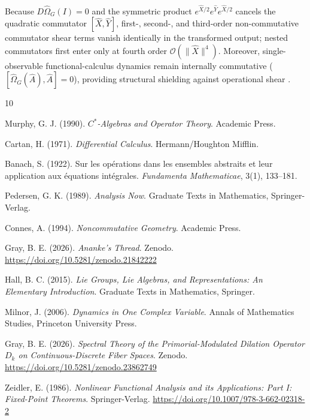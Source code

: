 \documentclass[11pt,a4paper]{article}
\begin{document}
Because $D\hat{\Omega}_G(I) = 0$ and the symmetric product $e^{\hat{X}/2}e^{\hat{Y}}e^{\hat{X}/2}$ cancels the quadratic commutator $[\hat{X}, \hat{Y}]$, first-, second-, and third-order non-commutative commutator shear terms vanish identically in the transformed output; nested commutators first enter only at fourth order $\mathcal{O}(\|\hat{X}\|^4)$. Moreover, single-observable functional-calculus dynamics remain internally commutative ($[\hat{\Omega}_G(\hat{A}), \hat{A}] = 0$), providing structural shielding against operational shear \cite{Cartan,GrayAnanke}.

\begin{thebibliography}{10}

Murphy, G. J. (1990). \textit{$C^*$-Algebras and Operator Theory}. Academic Press.

Cartan, H. (1971). \textit{Differential Calculus}. Hermann/Houghton Mifflin.

Banach, S. (1922). Sur les op\'erations dans les ensembles abstraits et leur application aux \'equations int\'egrales. \textit{Fundamenta Mathematicae}, 3(1), 133--181.

Pedersen, G. K. (1989). \textit{Analysis Now}. Graduate Texts in Mathematics, Springer-Verlag.

Connes, A. (1994). \textit{Noncommutative Geometry}. Academic Press.

Gray, B. E. (2026). \textit{Ananke's Thread}. Zenodo. \url{https://doi.org/10.5281/zenodo.21842222}

Hall, B. C. (2015). \textit{Lie Groups, Lie Algebras, and Representations: An Elementary Introduction}. Graduate Texts in Mathematics, Springer.

Milnor, J. (2006). \textit{Dynamics in One Complex Variable}. Annals of Mathematics Studies, Princeton University Press.

Gray, B. E. (2026). \textit{Spectral Theory of the Primorial-Modulated Dilation Operator $D_k$ on Continuous-Discrete Fiber Spaces}. Zenodo. \url{https://doi.org/10.5281/zenodo.23862749}

Zeidler, E. (1986). \textit{Nonlinear Functional Analysis and its Applications: Part I: Fixed-Point Theorems}. Springer-Verlag. \url{https://doi.org/10.1007/978-3-662-02318-2}

\end{thebibliography}
\end{document}
